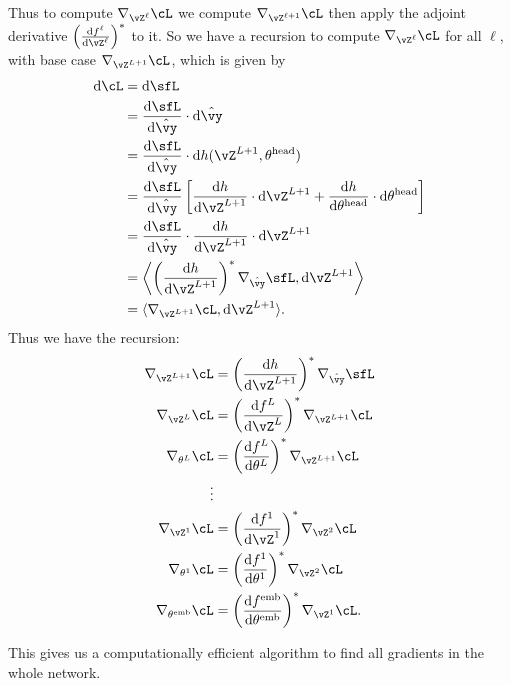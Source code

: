 \documentclass[../../book-main.tex]{subfiles}
\begin{document}
Thus to compute \(\nabla_{\vZ^{\ell}}\cL\) we compute \(\nabla_{\vZ^{\ell + 1}}\cL\) then apply the adjoint derivative \(\bp{\odv{f^{\ell}}{\vZ^{\ell}}}^{*}\) to it. So we have a recursion to compute \(\nabla_{\vZ^{\ell}}\cL\) for all \(\ell\), with base case \(\nabla_{\vZ^{L + 1}}\cL\), which is given by 
\begin{align}
    \odif{\cL}
    &= \odif{\sfL} \\
    &= \odv{\sfL}{\hat{\vy}}\cdot\odif{\hat{\vy}} \\
    &= \odv{\sfL}{\hat{\vy}}\cdot\odif{{h(\vZ^{L + 1}, \theta^{\head})}} \\ 
    &= \odv{\sfL}{\hat{\vy}}\bs{\odv{h}{\vZ^{L + 1}}\cdot\odif{\vZ}^{L + 1} + \odv{h}{\theta^{\head}}\cdot\odif{\theta}^{\head}} \\ 
    &= \odv{\sfL}{\hat{\vy}}\cdot \odv{h}{\vZ^{L + 1}}\cdot\odif{\vZ}^{L + 1} \\ 
    &= \ip*{\bp{\odv{h}{\vZ^{L + 1}}}^{*}\nabla_{\hat{\vy}}\sfL}{\odif{\vZ}^{L + 1}} \\ 
    &= \ip{\nabla_{\vZ^{L + 1}}\cL}{\odif{\vZ}^{L + 1}}.
\end{align}
Thus we have the recursion:
\begin{align}
    \nabla_{\vZ^{L + 1}}\cL 
    &= \bp{\odv{h}{\vZ^{L + 1}}}^{*}\nabla_{\hat{\vy}}\sfL \\ 
    \nabla_{\vZ^{L}}\cL 
    &= \bp{\odv{f^{L}}{\vZ^{L}}}^{*}\nabla_{\vZ^{L + 1}}\cL \\ 
    \nabla_{\theta^{L}}\cL
    &= \bp{\odv{f^{L}}{\theta^{L}}}^{*}\nabla_{\vZ^{L + 1}}\cL \\
    \vdots &  \\ 
    \nabla_{\vZ^{1}}\cL 
    &= \bp{\odv{f^{1}}{\vZ^{1}}}^{*}\nabla_{\vZ^{2}}\cL \\ 
    \nabla_{\theta^{1}}\cL 
    &= \bp{\odv{f^{1}}{\theta^{1}}}^{*}\nabla_{\vZ^{2}}\cL \\ 
    \nabla_{\theta^{\emb}}\cL 
    &= \bp{\odv{f^{\emb}}{\theta^{\emb}}}^{*}\nabla_{\vZ^{1}}\cL.
\end{align}

This gives us a computationally efficient algorithm to find all gradients in the whole network.
\end{document}
